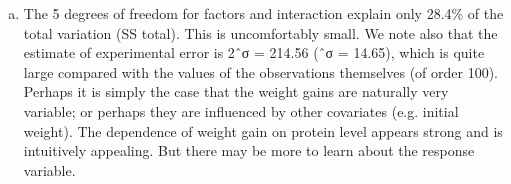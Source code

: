 \documentclass[a4paper,12pt]{article}
\begin{document}
\begin{enumerate}[(a)]
\begin{framed}
\end{framed}
\item The 5 degrees of freedom for factors and interaction explain only 28.4\% of the total variation (SS total). This is uncomfortably small.
We note also that the estimate of experimental error is 2ˆσ = 214.56 (ˆσ = 14.65), which is quite large compared with the values of the observations themselves (of order 100).
Perhaps it is simply the case that the weight gains are naturally very variable; or perhaps they are influenced by other covariates (e.g. initial weight).
The dependence of weight gain on protein level appears strong and is intuitively appealing. But there may be more to learn about the response variable.
 \end{enumerate}
 
\end{document}
